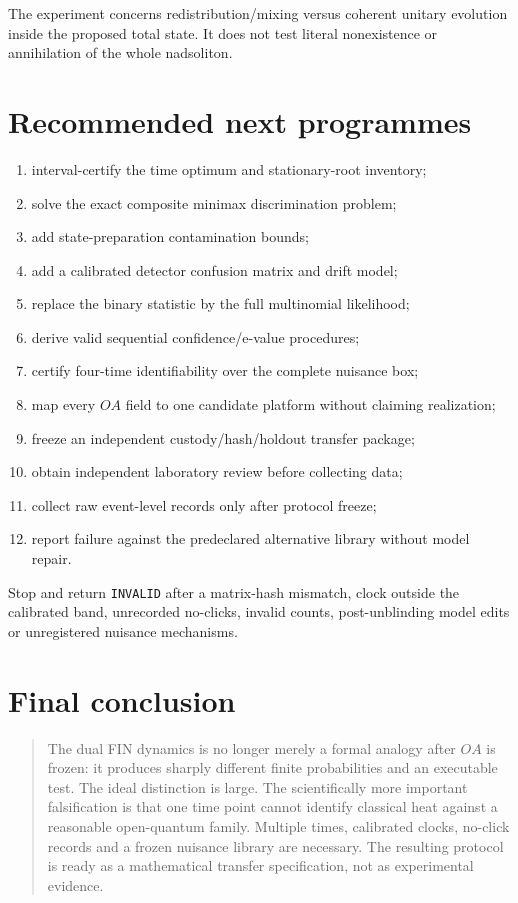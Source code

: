 \documentclass[11pt,a4paper]{article}
\begin{document}
The experiment concerns redistribution/mixing versus coherent unitary
evolution inside the proposed total state.  It does not test literal
nonexistence or annihilation of the whole nadsoliton.

\section{Recommended next programmes}

\begin{enumerate}
\item interval-certify the time optimum and stationary-root inventory;
\item solve the exact composite minimax discrimination problem;
\item add state-preparation contamination bounds;
\item add a calibrated detector confusion matrix and drift model;
\item replace the binary statistic by the full multinomial likelihood;
\item derive valid sequential confidence/e-value procedures;
\item certify four-time identifiability over the complete nuisance box;
\item map every $OA$ field to one candidate platform without claiming realization;
\item freeze an independent custody/hash/holdout transfer package;
\item obtain independent laboratory review before collecting data;
\item collect raw event-level records only after protocol freeze;
\item report failure against the predeclared alternative library without model repair.
\end{enumerate}

Stop and return \texttt{INVALID} after a matrix-hash mismatch, clock outside
the calibrated band, unrecorded no-clicks, invalid counts, post-unblinding
model edits or unregistered nuisance mechanisms.

\section{Final conclusion}

\begin{quote}
The dual FIN dynamics is no longer merely a formal analogy after $OA$ is
frozen: it produces sharply different finite probabilities and an executable
test.  The ideal distinction is large.  The scientifically more important
falsification is that one time point cannot identify classical heat against a
reasonable open-quantum family.  Multiple times, calibrated clocks, no-click
records and a frozen nuisance library are necessary.  The resulting protocol
is ready as a mathematical transfer specification, not as experimental
evidence.
\end{quote}
\end{document}
